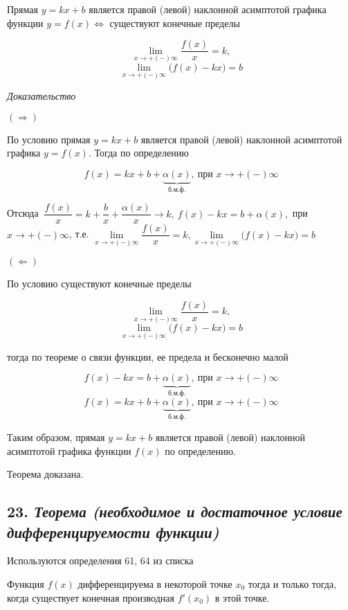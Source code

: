 Прямая $y = kx + b$ является правой (левой) наклонной асимптотой графика функции $y = f(x) \iff$ существуют конечные пределы

$$\lim\limits_{x \to +(-)\infty}{\dfrac{f(x)}{x}} = k,$$ $$\lim\limits_{x \to +(-)\infty}{\big(f(x) - kx\big)} = b$$
\vspace*{20pt} 

\textit{Доказательство}

$(\Rightarrow)$

По условию прямая $y = kx + b$ является правой (левой) наклонной асимптотой графика $y = f(x)$. Тогда по определению

$$
f(x) = kx+b+\underbrace{\alpha(x)}_{\text{б.м.ф.}},\ \text{при } x \rightarrow +(-)\infty
$$

Отсюда $\ {\dfrac{f(x)}{x}} = k + {\dfrac{b}{x}} + {\dfrac{\alpha(x)}{x}} \rightarrow k, \ f(x) - kx = b + \alpha(x), $ при $x \rightarrow +(-)\infty$, т.е. $\lim\limits_{x \to +(-)\infty}{\dfrac{f(x)}{x}} = k,  \lim\limits_{x \to +(-)\infty}{\big(f(x) - kx\big)} = b$

$(\Leftarrow)$

По условию существуют конечные пределы

$$\lim\limits_{x \to +(-)\infty}{\dfrac{f(x)}{x}} = k,$$ $$\lim\limits_{x \to +(-)\infty}{\big(f(x) - kx\big)} = b$$

тогда по теореме о связи функции, ее предела и бесконечно малой

$${f(x) - kx} = b + \underbrace{\alpha(x)}_{\text{б.м.ф.}},\ \text{при } x \rightarrow +(-)\infty$$ $${f(x)} = kx + b + \underbrace{\alpha(x)}_{\text{б.м.ф.}},\ \text{при } x \rightarrow +(-)\infty$$

Таким образом, прямая $y = kx + b$ является правой (левой) наклонной асимптотой графика функции $f(x)$ по определению.

Теорема доказана.
\newpage 
\subsection*{23. \textit{Теорема (необходимое и достаточное условие дифференцируемости функции)}}
\begin{Quote2} 
\small\centering 

Используются определения 61, 64 из списка \end{Quote2} 

Функция $f(x)$ дифференцируема в некоторой точке $x_0$ тогда и только тогда, когда существует конечная производная $f'(x_0)$ в этой точке.
\vspace*{20pt} 

